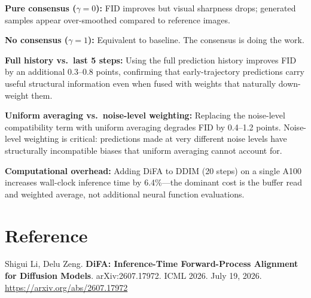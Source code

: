 \documentclass[10pt,twocolumn]{article}
\begin{document}
\textbf{Pure consensus ($\gamma = 0$):} FID improves but visual
sharpness drops; generated samples appear over-smoothed compared to
reference images.

\textbf{No consensus ($\gamma = 1$):} Equivalent to baseline. The
consensus is doing the work.

\textbf{Full history vs.\ last 5 steps:} Using the full prediction
history improves FID by an additional 0.3--0.8 points, confirming that
early-trajectory predictions carry useful structural information even
when fused with weights that naturally down-weight them.

\textbf{Uniform averaging vs.\ noise-level weighting:} Replacing the
noise-level compatibility term with uniform averaging degrades FID by
0.4--1.2 points. Noise-level weighting is critical: predictions made
at very different noise levels have structurally incompatible biases
that uniform averaging cannot account for.

\textbf{Computational overhead:} Adding DiFA to DDIM (20 steps) on a
single A100 increases wall-clock inference time by 6.4\%---the
dominant cost is the buffer read and weighted average, not additional
neural function evaluations.

\section*{Reference}

Shigui Li, Delu Zeng.
\textbf{DiFA: Inference-Time Forward-Process Alignment for Diffusion Models}.
arXiv:2607.17972. ICML 2026. July 19, 2026.
\url{https://arxiv.org/abs/2607.17972}
\end{document}

